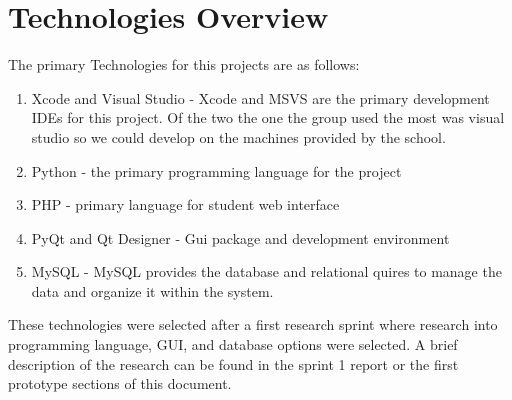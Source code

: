 \section{Technologies Overview}
The primary Technologies for this projects are as follows:

\begin{enumerate}
\item Xcode and Visual Studio - Xcode and MSVS are the primary development IDEs for this project. Of the two the one the group used the most was visual studio so we could develop on the machines provided by the school.
\item Python - the primary programming language for the project
\item PHP - primary language for student web interface
\item PyQt and Qt Designer - Gui package and development environment 
\item MySQL - MySQL provides the database and relational quires to manage the data and organize it within the system.
\end{enumerate}


These technologies were selected after a first research sprint where research into programming language, GUI, and database options were selected. A brief description                    of the research can be found in the sprint 1 report or the first prototype sections of this document.